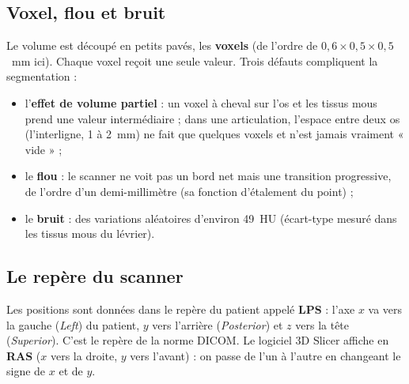 \documentclass[11pt,a4paper]{article}
\begin{document}
\subsection{Voxel, flou et bruit}

Le volume est découpé en petits pavés, les \textbf{voxels} (de l'ordre de $0{,}6 \times 0{,}5 \times 0{,}5$~mm ici).
Chaque voxel reçoit une seule valeur. Trois défauts compliquent la segmentation :
\begin{itemize}
  \item l'\textbf{effet de volume partiel} : un voxel à cheval sur l'os et les tissus mous prend une valeur
  intermédiaire ; dans une articulation, l'espace entre deux os (l'interligne, 1 à 2~mm) ne fait que quelques voxels
  et n'est jamais vraiment « vide » ;
  \item le \textbf{flou} : le scanner ne voit pas un bord net mais une transition progressive, de l'ordre d'un
  demi-millimètre (sa fonction d'étalement du point) ;
  \item le \textbf{bruit} : des variations aléatoires d'environ 49~HU (écart-type mesuré dans les tissus mous du
  lévrier).
\end{itemize}

\subsection{Le repère du scanner}

Les positions sont données dans le repère du patient appelé \textbf{LPS} : l'axe $x$ va vers la gauche (\emph{Left})
du patient, $y$ vers l'arrière (\emph{Posterior}) et $z$ vers la tête (\emph{Superior}). C'est le repère de la norme
DICOM. Le logiciel 3D Slicer affiche en \textbf{RAS} ($x$ vers la droite, $y$ vers l'avant) : on passe de l'un à
l'autre en changeant le signe de $x$ et de $y$.
\end{document}
